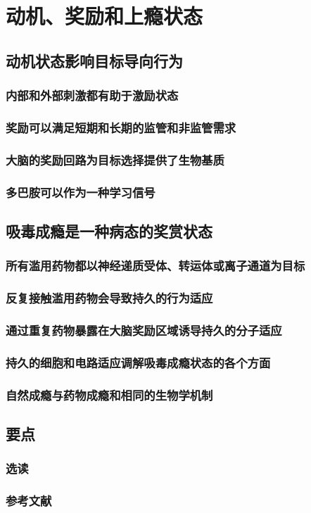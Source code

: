 \chapter{动机、奖励和上瘾状态}


\section{动机状态影响目标导向行为}
\subsection{内部和外部刺激都有助于激励状态}
\subsection{奖励可以满足短期和长期的监管和非监管需求}
\subsection{大脑的奖励回路为目标选择提供了生物基质}
\subsection{多巴胺可以作为一种学习信号}

\section{吸毒成瘾是一种病态的奖赏状态}
\subsection{所有滥用药物都以神经递质受体、转运体或离子通道为目标}
\subsection{反复接触滥用药物会导致持久的行为适应}
\subsection{通过重复药物暴露在大脑奖励区域诱导持久的分子适应}
\subsection{持久的细胞和电路适应调解吸毒成瘾状态的各个方面}
\subsection{自然成瘾与药物成瘾和相同的生物学机制}

\section{要点}
\subsection{选读}
\subsection{参考文献}